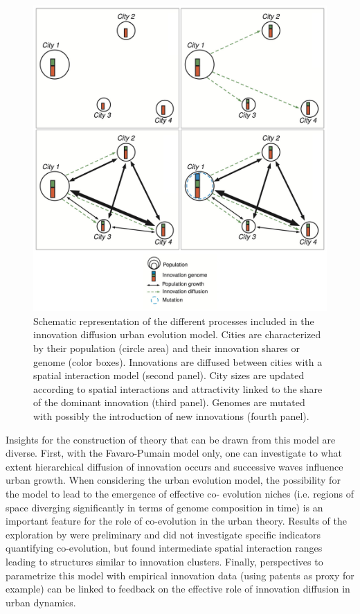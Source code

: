\documentclass[10pt,letterpaper]{article}
\begin{document}
\begin{figure}
	\includegraphics[width=\linewidth]{figures/Fig2.jpg}	
	\caption{Schematic representation of the different processes included in the innovation diffusion urban evolution model. Cities are characterized by their population (circle area) and their innovation shares or genome (color boxes). Innovations are diffused between cities with a spatial interaction model (second panel). City sizes are updated according to spatial interactions and attractivity linked to the share of the dominant innovation (third panel). Genomes are mutated with possibly the introduction of new innovations (fourth panel).\label{fig:fig2}}
\end{figure}


Insights for the construction of theory that can be drawn from this model are diverse. First, with the Favaro-Pumain model only, one can investigate to what extent hierarchical diffusion of innovation occurs and successive waves influence urban growth. When considering the urban evolution model, the possibility for the model to lead to the emergence of effective co- evolution niches (i.e. regions of space diverging significantly in terms of genome composition in time) is an important feature for the role of co-evolution in the urban theory. Results of the exploration by \citep{raimbault2020model} were preliminary and did not investigate specific indicators quantifying co-evolution, but found intermediate spatial interaction ranges leading to structures similar to innovation clusters. Finally, perspectives to parametrize this model with empirical innovation data (using patents as proxy for example) can be linked to feedback on the effective role of innovation diffusion in urban dynamics.
\end{document}
